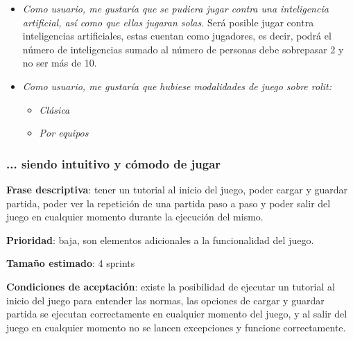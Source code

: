 \documentclass[../../FINAL/Scrum/SCRUM.tex]{subfiles}
\begin{document}
\begin{itemize}
\item  \textit{Como usuario, me gustaría que se pudiera jugar contra una inteligencia artificial, así como que ellas jugaran solas. }
    Será posible jugar contra inteligencias artificiales, estas cuentan como jugadores, es decir, podrá el número de inteligencias sumado al número de personas debe sobrepasar 2 y no ser más de 10.

\item \textit{Como usuario, me gustaría que hubiese modalidades de juego sobre rolit:}
\begin{itemize}
	 \item  \textit{Clásica} 
     \item  \textit{Por equipos }
\end{itemize}
\end{itemize}


\subsubsection{... siendo intuitivo y cómodo de jugar}
\textbf{Frase descriptiva}: tener un tutorial al inicio del juego, poder cargar y guardar partida, poder ver la repetición de una partida paso a paso y poder salir del juego en cualquier momento durante la ejecución del mismo.

\textbf{Prioridad}: baja, son elementos adicionales a la funcionalidad del juego.

\textbf{Tamaño estimado}: 4 sprints

\textbf{Condiciones de aceptación}: existe la posibilidad de ejecutar un tutorial al inicio del juego para entender las normas, las opciones de cargar y guardar partida se ejecutan correctamente en cualquier momento del juego, y al salir del juego en cualquier momento no se lancen excepciones y funcione correctamente.
\end{document}
